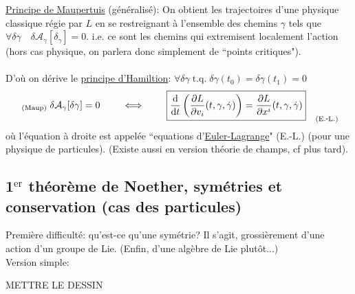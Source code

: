 \documentclass[a4paper,11pt]{article}
\renewcommand{\d}{{\mathrm{d}}}
\newcommand{\dr}[2]{\frac{\partial {#1}}{\partial{#2}}}
\begin{document}
\underline{Principe de Maupertuis} (généralisé): On obtient les trajectoires d'une physique classique régie par $L$ en se restreignant à l'ensemble des chemins $\gamma$ tels que $\forall \delta \gamma \quad \delta\mathcal{A}_\gamma[\delta_\gamma]=0$. i.e. ce sont les chemins qui extremisent localement l'action (hors cas physique, on parlera donc simplement de ``points critiques").\\ \\
D'où on dérive le \underline{principe d'Hamiltion}: 
$\forall \delta\gamma \; \mathrm{t}.\mathrm{q}.\; \delta\gamma(t_0)=\delta\gamma(t_1)=0$
\begin{equation*}
\;_{(\mathrm{Maup})} \; \delta\mathcal{A}_\gamma[\delta\gamma] = 0 \quad \quad \iff \quad \quad \boxed{\frac{\d}{\d t}\left(\dr{L}{v_i}(t,\gamma,\dot\gamma)\right) = \dr{L}{x^i}(t,\gamma,\dot\gamma)}_{\quad(\mathrm{E}.\scalebox{0.75}[1.0]{-}\mathrm{L}.)}
\end{equation*}
où l'équation à droite est appelée ``equations d'\underline{Euler-Lagrange}" (E.-L.) (pour une physique de particules). (Existe aussi en version théorie de champs, cf plus tard).

\subsection{1$^\mathrm{er}$ théorème de Noether, symétries et conservation (cas des particules)}
Première difficulté: qu'est-ce qu'une symétrie? Il s'agit, grossièrement d'une action d'un groupe de Lie. (Enfin, d'une algèbre de Lie plutôt...)\\
Version simple:

\color{red}METTRE LE DESSIN\color{black}
\end{document}
